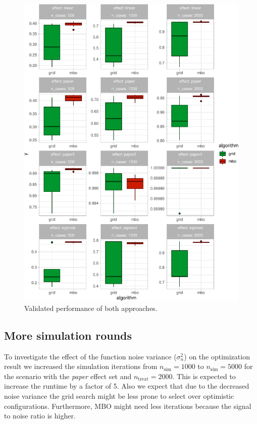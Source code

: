 \documentclass[bimj,fleqn]{w-art}
\theoremstyle{plain}
\theoremstyle{definition}
\begin{document}
\begin{figure}[htb]
\centering
\includegraphics[width=\linewidth]{generated/figures/plot_boxplot_valid_y.pdf}
\caption{%
  Validated performance of both approaches.
  }
\label{fig:plot_boxplot_valid_y}
\end{figure}





\subsection{More simulation rounds}

To investigate the effect of the function noise variance ($\sigma^2_n$) on the optimization result we increased the simulation iterations from $n_\text{sim} = 1000$ to $n_\text{sim} = 5000$ for the scenario with the \emph{paper} effect set and  $n_{\text{treat}} = 2000$.
This is expected to increase the runtime by a factor of 5.
Also we expect that due to the decreased noise variance the grid search might be less prone to select over optimistic configurations.
Furthermore, MBO might need less iterations because the signal to noise ratio is higher.
\end{document}

